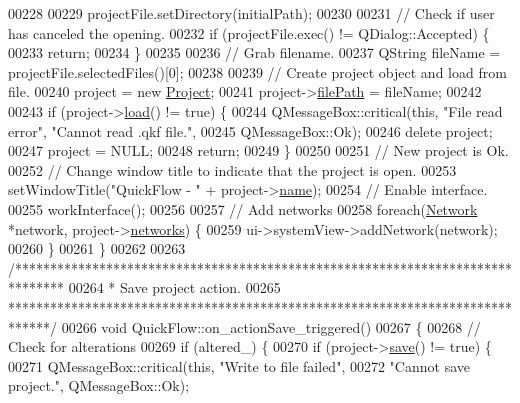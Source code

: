 \begin{DoxyCode}
00228 
00229   projectFile.setDirectory(initialPath);
00230 
00231   \textcolor{comment}{// Check if user has canceled the opening.}
00232   \textcolor{keywordflow}{if} (projectFile.exec() != QDialog::Accepted) \{
00233     \textcolor{keywordflow}{return};
00234   \}
00235 
00236   \textcolor{comment}{// Grab filename.}
00237   QString fileName = projectFile.selectedFiles()[0];
00238 
00239   \textcolor{comment}{// Create project object and load from file.}
00240   project = \textcolor{keyword}{new} \hyperlink{class_project}{Project};
00241   project->\hyperlink{class_project_a79f30adcefd0b72bd4ac7db724bc9531}{filePath} = fileName;
00242 
00243   \textcolor{keywordflow}{if} (project->\hyperlink{class_project_a1e373892a0383371132ce68fa5f8813d}{load}() != \textcolor{keyword}{true}) \{
00244     QMessageBox::critical(\textcolor{keyword}{this}, \textcolor{stringliteral}{"File read error"}, \textcolor{stringliteral}{"Cannot read .qkf file."},
00245                           QMessageBox::Ok);
00246     \textcolor{keyword}{delete} project;
00247     project = NULL;
00248     \textcolor{keywordflow}{return};
00249   \}
00250 
00251   \textcolor{comment}{// New project is Ok.}
00252   \textcolor{comment}{// Change window title to indicate that the project is open.}
00253   setWindowTitle(\textcolor{stringliteral}{"QuickFlow - "} + project->\hyperlink{class_project_a82dd2d1bc38f9fd08c9a811fcaa76b38}{name});
00254   \textcolor{comment}{// Enable interface.}
00255   workInterface();
00256 
00257   \textcolor{comment}{// Add networks}
00258   \textcolor{keywordflow}{foreach}(\hyperlink{class_network}{Network} *network, project->\hyperlink{class_project_aa98126154cab59769a431668e6f17daf}{networks}) \{
00259     ui->systemView->addNetwork(network);
00260   \}
00261 \}
00262 
00263 \textcolor{comment}{/*******************************************************************************}
00264 \textcolor{comment}{ * Save project action.}
00265 \textcolor{comment}{ ******************************************************************************/}
00266 \textcolor{keywordtype}{void} QuickFlow::on\_actionSave\_triggered()
00267 \{
00268   \textcolor{comment}{// Check for alterations}
00269   \textcolor{keywordflow}{if} (altered\_) \{
00270     \textcolor{keywordflow}{if} (project->\hyperlink{class_project_a596a875bc5be73bc5b1b71b6448c1e07}{save}() != \textcolor{keyword}{true}) \{
00271       QMessageBox::critical(\textcolor{keyword}{this}, \textcolor{stringliteral}{"Write to file failed"},
00272                             \textcolor{stringliteral}{"Cannot save project."}, QMessageBox::Ok);

\end{DoxyCode}
